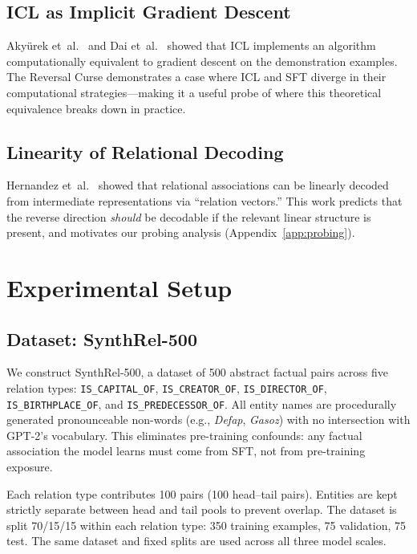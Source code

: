 \documentclass[11pt]{article}
\begin{document}
\subsection{ICL as Implicit Gradient Descent}

Akyürek et~al.~\cite{akyurek2022learning} and Dai et~al.~\cite{dai2023gpt}
showed that ICL implements an algorithm computationally equivalent to gradient
descent on the demonstration examples. The Reversal Curse demonstrates a case
where ICL and SFT diverge in their computational strategies---making it a useful
probe of where this theoretical equivalence breaks down in practice.

\subsection{Linearity of Relational Decoding}

Hernandez et~al.~\cite{hernandez2023linearity} showed that relational
associations can be linearly decoded from intermediate representations via
``relation vectors.'' This work predicts that the reverse direction
\emph{should} be decodable if the relevant linear structure is present, and
motivates our probing analysis (Appendix~\ref{app:probing}).

\section{Experimental Setup}
\label{sec:setup}

\subsection{Dataset: SynthRel-500}

We construct SynthRel-500, a dataset of 500 abstract factual pairs across
five relation types: \texttt{IS\_CAPITAL\_OF}, \texttt{IS\_CREATOR\_OF},
\texttt{IS\_DIRECTOR\_OF}, \texttt{IS\_BIRTHPLACE\_OF}, and
\texttt{IS\_PREDECESSOR\_OF}. All entity names are procedurally generated
pronounceable non-words (e.g., \emph{Defap}, \emph{Gasoz}) with no intersection
with GPT-2's vocabulary. This eliminates pre-training confounds: any factual
association the model learns must come from SFT, not from pre-training exposure.

Each relation type contributes 100 pairs (100 head--tail pairs). Entities are
kept strictly separate between head and tail pools to prevent overlap. The
dataset is split 70/15/15 within each relation type: 350 training examples, 75
validation, 75 test. The same dataset and fixed splits are used across all three
model scales.
\end{document}
